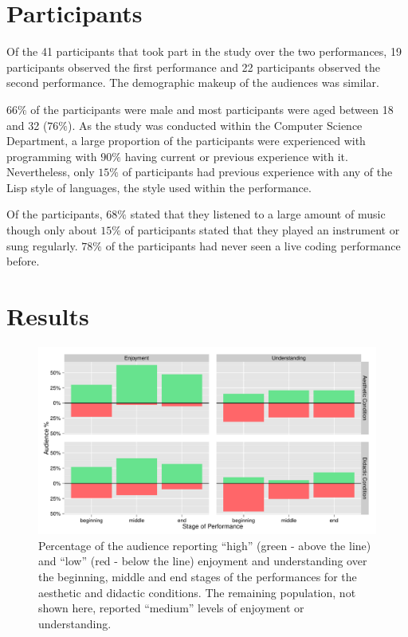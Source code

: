 \section{Participants}

Of the 41 participants that took part in the study over the two performances, 19 participants observed the first performance and 22 participants observed the second performance. The demographic makeup of the audiences was similar.

$66\%$ of the participants were male and most participants were aged between 18 and 32 ($76\%$). As the study was conducted within the Computer Science Department, a large proportion of the participants were experienced with programming with $90\%$ having current or previous experience with it. Nevertheless, only $15\%$ of participants had previous experience with any of the Lisp style of languages, the style used within the performance.

Of the participants, $68\%$ stated that they listened to a large amount of music though only about $15\%$ of participants stated that they played an instrument or sung regularly. $78\%$ of the participants had never seen a live coding performance before.

\section{Results}

\begin{figure}
  \centering
  \includegraphics[width=\columnwidth]{../study-2/results/graphs/dimension-condition.pdf}
  \caption[User study survey condition and dimension results]{Percentage of the audience reporting ``high'' (green - above
the line) and ``low'' (red - below the line) enjoyment and
understanding over the beginning, middle and end stages of the
performances for the aesthetic and didactic conditions. The remaining
population, not shown here, reported ``medium'' levels of enjoyment or
understanding.}
  \label{fig:dimension-condition}
\end{figure}

